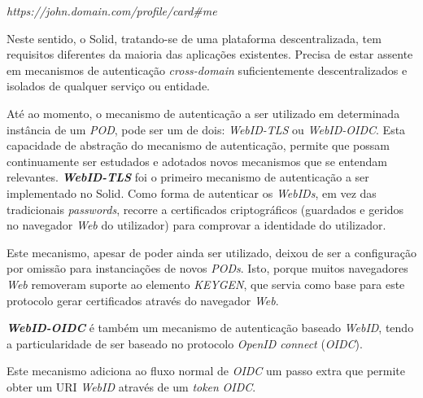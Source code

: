\begin{center}
    \emph{https://john.domain.com/profile/card\#me}
\end{center}

Neste sentido, o Solid, tratando-se de uma plataforma descentralizada, tem requisitos diferentes da maioria das aplicações existentes. Precisa de estar assente em mecanismos de autenticação \emph{cross-domain} suficientemente descentralizados e isolados de qualquer serviço ou entidade\cite{solid_spec}.

Até ao momento, o mecanismo de autenticação a ser utilizado em determinada instância de um \emph{\acrshort{POD}}, pode ser um de dois: \emph{WebID-TLS} ou \emph{WebID-OIDC}. Esta capacidade de abstração do mecanismo de autenticação, permite que possam continuamente ser estudados e adotados novos mecanismos que se entendam relevantes\cite{solid_spec}.
\newpara
\textbf{\emph{WebID-TLS}} foi o primeiro mecanismo de autenticação a ser implementado no Solid. Como forma de autenticar os \emph{WebIDs}, em vez das tradicionais \emph{passwords}, recorre a certificados criptográficos (guardados e geridos no navegador \emph{Web} do utilizador) para comprovar a identidade do utilizador\cite{solid_webid-tls:}.

Este mecanismo, apesar de poder ainda ser utilizado, deixou de ser a configuração por omissão para instanciações de novos \emph{PODs}. Isto, porque muitos navegadores \emph{Web} removeram suporte ao elemento \emph{KEYGEN}, que servia como base para este protocolo gerar certificados através do navegador \emph{Web}\cite{solid_webid-tls:}.

\newpara
\textbf{\emph{WebID-OIDC}} é também um mecanismo de autenticação baseado \emph{WebID}, tendo a particularidade de ser baseado no protocolo \emph{OpenID connect} (\emph{OIDC}). 

Este mecanismo adiciona ao fluxo normal de \emph{OIDC} um passo extra que permite obter um URI \emph{WebID} através de um \emph{token} \emph{OIDC}\cite{solid_webid_oidc}.

